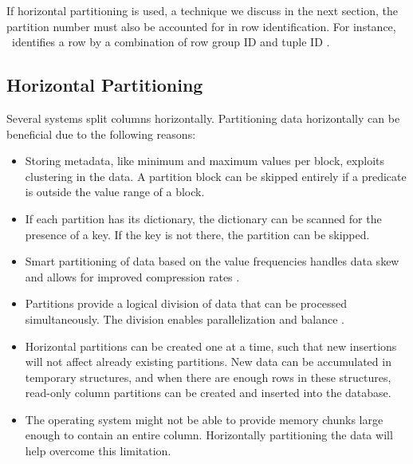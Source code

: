 If horizontal partitioning is used, a technique we discuss in the next section, the partition number must also be accounted for in row identification. For instance, \mssql~identifies a row by a combination of row group ID and tuple ID \cite{Larson2013-mc}.

\subsection{Horizontal Partitioning}
\label{sub:Horizontal Partitioning}


Several systems split columns horizontally. Partitioning data horizontally can be beneficial due to the following reasons:
\begin{itemize}
  \item Storing metadata, like minimum and maximum values per block, exploits clustering in the data. A partition block can be skipped entirely if a predicate is outside the value range of a block.
  \item If each partition has its dictionary, the dictionary can be scanned for the presence of a key. If the key is not there, the partition can be skipped.
  \item Smart partitioning of data based on the value frequencies handles data skew and allows for improved compression rates \cite{Raman2008-gi}. 
  \item Partitions provide a logical division of data that can be processed simultaneously. The division enables parallelization and balance \cite{Exasol2014-xh}.
  \item Horizontal partitions can be created one at a time, such that new insertions will not affect already existing partitions. New data can be accumulated in temporary structures, and when there are enough rows in these structures, read-only column partitions can be created and inserted into the database.
  \item The operating system might not be able to provide memory chunks large enough to contain an entire column. Horizontally partitioning the data will help overcome this limitation.
\end{itemize}


